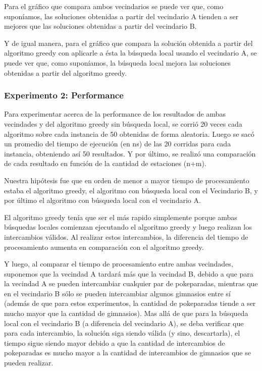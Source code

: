 \blindtext


\par Para el gráfico que compara ambos vecindarios se puede ver que, como suponíamos, las soluciones obtenidas a partir del vecindario A tienden a ser mejores que las soluciones obtenidas a partir del vecindario B.

\par Y de igual manera, para el gráfico que compara la solución obtenida a partir del algoritmo greedy con aplicarle a ésta la búsqueda local usando el vecindario A, se puede ver que, como suponíamos, la búsqueda local mejora las soluciones obtenidas a partir del algoritmo greedy.

\subsubsection{Experimento 2: Performance} 
            Para experimentar acerca de la performance de los resultados de ambas vecindades y del algoritmo greedy sin búsqueda local, se corrió 20 veces cada algoritmo sobre cada instancia de 50 obtenidas de forma aleatoria. Luego se sacó un promedio del tiempo de ejecución (en ns) de las 20 corridas para cada instancia, obteniendo así 50 resultados. Y por último, se realizó una comparación de cada resultado en función de la cantidad de estaciones (n+m).

            \par Nuestra hipótesis fue que en orden de menor a mayor tiempo de procesamiento estaba el algoritmo greedy, el algoritmo con búsqueda local con el Vecindario B, y por último el algoritmo con búsqueda local con el vecindario A.
            \par El algoritmo greedy tenía que ser el más rapido simplemente porque ambas búsquedas locales comienzan ejecutando el algoritmo greedy y luego realizan los intercambios válidos. Al realizar estos intercambios, la diferencia del tiempo de procesamiento aumenta en comparación con el algoritmo greedy.
            \par Y luego, al comparar el tiempo de procesamiento entre ambas vecindades, suponemos que la vecindad A tardará más que la vecindad B, debido a que para la vecindad A se pueden intercambiar cualquier par de pokeparadas, mientras que en el vecindario B sólo se pueden intercambiar algunos gimnasios entre sí (además de que para estos experimentos, la cantidad de pokeparadas tiende a ser mucho mayor que la cantidad de gimnasios).
            Mas allá de que para la búsqueda local con el vecindario B (a diferencia del vecindario A), se deba verificar que para cada intercambio, la solución siga siendo válida (y sino, descartarla), el tiempo sigue siendo mayor debido a que la cantidad de intercambios de pokeparadas es mucho mayor a la cantidad de intercambios de gimnasios que se pueden realizar.

